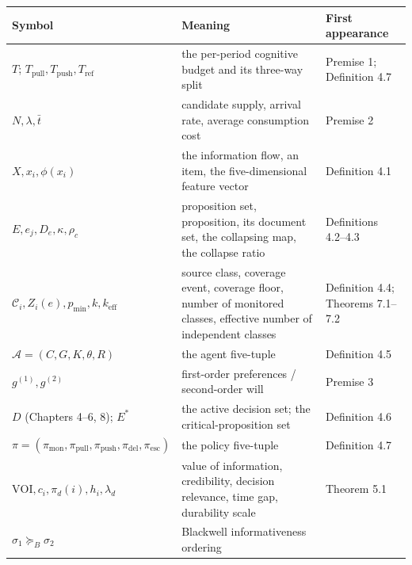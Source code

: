 \documentclass[
  11pt]{article}
\begin{document}
\begin{longtable}[]{@{}
  >{\raggedright\arraybackslash}p{}
  >{\raggedright\arraybackslash}p{}
  >{\raggedright\arraybackslash}p{}@{}}
\toprule\noalign{}
\begin{minipage}[b]{\linewidth}\raggedright
Symbol
\end{minipage} & \begin{minipage}[b]{\linewidth}\raggedright
Meaning
\end{minipage} & \begin{minipage}[b]{\linewidth}\raggedright
First appearance
\end{minipage} \\
\midrule\noalign{}
\endhead
\bottomrule\noalign{}
\endlastfoot
\(T\); \(T_{\mathrm{pull}}, T_{\mathrm{push}}, T_{\mathrm{ref}}\) & the
per-period cognitive budget and its three-way split & Premise 1;
Definition 4.7 \\
\(N, \lambda, \bar t\) & candidate supply, arrival rate, average
consumption cost & Premise 2 \\
\(X, x_i, \phi(x_i)\) & the information flow, an item, the
five-dimensional feature vector & Definition 4.1 \\
\(E, e_j, D_e, \kappa, \rho_c\) & proposition set, proposition, its
document set, the collapsing map, the collapse ratio & Definitions
4.2--4.3 \\
\(\mathcal{C}_i, Z_i(e), p_{\min}, k, k_{\mathrm{eff}}\) & source class,
coverage event, coverage floor, number of monitored classes, effective
number of independent classes & Definition 4.4; Theorems 7.1--7.2 \\
\(\mathcal{A}=(C,G,K,\theta,R)\) & the agent five-tuple & Definition
4.5 \\
\(g^{(1)}, g^{(2)}\) & first-order preferences / second-order will &
Premise 3 \\
\(D\) (Chapters 4--6, 8); \(E^*\) & the active decision set; the
critical-proposition set & Definition 4.6 \\
\(\pi=(\pi_{\mathrm{mon}},\pi_{\mathrm{pull}},\pi_{\mathrm{push}},\pi_{\mathrm{del}},\pi_{\mathrm{esc}})\)
& the policy five-tuple & Definition 4.7 \\
\(\mathrm{VOI}, c_i, \pi_d(i), h_i, \lambda_d\) & value of information,
credibility, decision relevance, time gap, durability scale & Theorem
5.1 \\
\(\sigma_1 \succeq_B \sigma_2\) & Blackwell informativeness ordering

\end{longtable}
\end{document}
